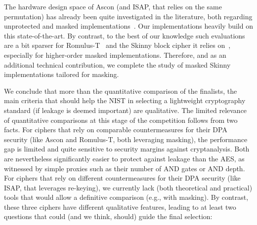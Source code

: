 \documentclass{llncs}
\begin{document}
\smallskip

The hardware design space of Ascon (and ISAP, that relies on the same permutation) has already been
quite investigated in the literature, both regarding unprotected and 
masked implementations~\cite{DBLP:conf/dsd/GrossWDE15,Elsevier2017}. 
Our implementations heavily build on this state-of-the-art.
By contrast, to the best of our knowledge
such evaluations are a bit sparser for Romulus-T~\cite{NIST22}
and the Skinny block cipher it relies on~\cite{DBLP:journals/tosc/BeierleJKLMPSSS20},
especially for higher-order masked implementations.
Therefore, and as an additional technical contribution, we complete
the study of masked Skinny implementations tailored
for masking.

\medskip

We conclude that more than the quantitative comparison of the finalists,  
the main criteria that should help the NIST in selecting a lightweight 
cryptography standard (if leakage is deemed important) are qualitative. The limited relevance
of quantitative comparisons at this stage of the competition follows from
two facts. For ciphers that rely on comparable countermeasures for their DPA security (like
Ascon and Romulus-T, both leveraging masking), the performance gap is limited and quite sensitive
to security margins against cryptanalysis. Both are nevertheless significantly easier to protect against
leakage than the AES, as witnessed by simple proxies such as their number of AND gates or AND depth.
For ciphers that rely on different countermeasures for their DPA security (like ISAP, that leverages re-keying),
we currently lack (both theoretical and practical) tools that would allow 
a definitive comparison (e.g., with masking). By contrast, these three ciphers have different
qualitative features, leading to at least two questions that could (and we think, should) guide the final selection:
\end{document}
